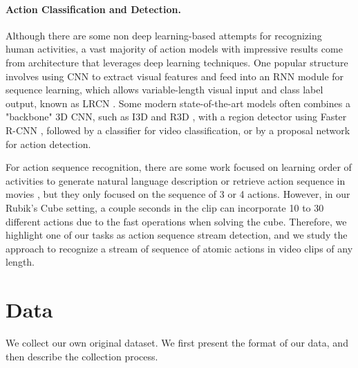 \documentclass[10pt,twocolumn,letterpaper]{article}
\begin{document}
\paragraph{Action Classification and Detection.} Although there are some non deep learning-based attempts \cite{sadek2012fast, stochastic} for recognizing human activities, a vast majority of action models with impressive results come from architecture that leverages deep learning techniques. One popular structure involves using CNN to extract visual features and feed into an RNN module for sequence learning, which allows variable-length visual input and class label output, known as LRCN \cite{lrcn}. Some modern state-of-the-art models \cite{ava, better_ava} often combines a "backbone" 3D CNN, such as I3D \cite{i3d} and R3D \cite{r3d}, with a region detector using Faster R-CNN \cite{faster_rcnn}, followed by a classifier for video classification, or by a proposal network \cite{ss-tad, g-tad} for action detection. 

For action sequence recognition, there are some work focused on learning order of activities to generate natural language description \cite{ng2019human} or retrieve action sequence in movies \cite{action_sequence_movie}, but they only focused on the sequence of 3 or 4 actions. However, in our Rubik's Cube setting, a couple seconds in the clip can incorporate 10 to 30 different actions due to the fast operations when solving the cube. Therefore, we highlight one of our tasks as action sequence stream detection, and we study the approach to recognize a stream of sequence of atomic actions in video clips of any length. 


\section{Data}


We collect our own original dataset. We first present the format of our data, and then describe the collection process.
\vspace{-5mm}
\end{document}
